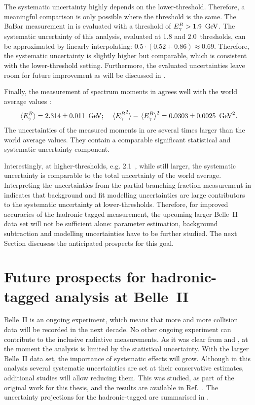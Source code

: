 The systematic uncertainty highly depends on the lower-\EB threshold.
Therefore, a meaningful comparison is only possible where the \EB threshold is the same.
The BaBar measurement in  is evaluated with a threshold of ${E^B_{\gamma}}>1.9~\mathrm{\,Ge\kern -0.1em V}$.
The systematic uncertainty of this analysis, evaluated at $1.8$ and $2.0$~\gev thresholds, can be approximated by linearly interpolating: $0.5\cdot(0.52+0.86)\approx0.69$.
Therefore, the systematic uncertainty is slightly higher but comparable, which is consistent with the lower-\EB threshold setting.
Furthermore, the evaluated uncertainties leave room for future improvement as will be discussed in .

Finally, the measurement of \EB spectrum moments in  agrees well with the world average values \cite{Workman:2022ynf}:
\begin{equation}
    \expval**{{E^B_{\gamma}}} = 2.314 \pm 0.011 ~\mathrm{\,Ge\kern -0.1em V}; \quad \expval**{{E^B_{\gamma}}^2} - \expval**{{E^B_{\gamma}}}^2 = 0.0303 \pm 0.0025~\mathrm{\,Ge\kern -0.1em V}^2.
\end{equation}
The uncertainties of the measured moments in  are several times larger than the world average values.
They contain a comparable significant statistical and systematic uncertainty component.

Interestingly, at higher-\EB thresholds, e.g. 2.1~\gev, while still larger, the systematic uncertainty is comparable to the total uncertainty of the world average.
Interpreting the uncertainties from the partial branching fraction measurement in  indicates that background and fit modelling uncertainties are large contributors to the systematic uncertainty at lower-\EB thresholds.
Therefore, for improved accuracies of the hadronic tagged measurement,
the upcoming larger Belle~II data set will not be sufficient alone:
parameter estimation, background subtraction and modelling uncertainties have to be further studied.
The next Section discusess the anticipated prospects for this goal.

\section[Future prospects for hadronic-tagged \safeBtoXsgamma at Belle~II]{Future prospects for hadronic-tagged \safeBtoXsgamma analysis at Belle~II}\label{sec:future_prospects}

Belle~II is an ongoing experiment, which means that more and more \epem collision data will be recorded in the next decade.
No other ongoing experiment can contribute to the inclusive radiative measurements.
As it was clear from  and , at the moment the analysis is limited by the statistical uncertainty.
With the larger Belle~II data set, the importance of systematic effects will grow.
Although in this analysis several systematic uncertainties are set at their conservative estimates,
additional studies will allow reducing them.
This was studied, as part of the original work for this thesis, and the results are available in Ref.~\cite{Belle-II:2022cgf}.
The uncertainty projections for the hadronic-tagged \BtoXsgamma are summarised in .

